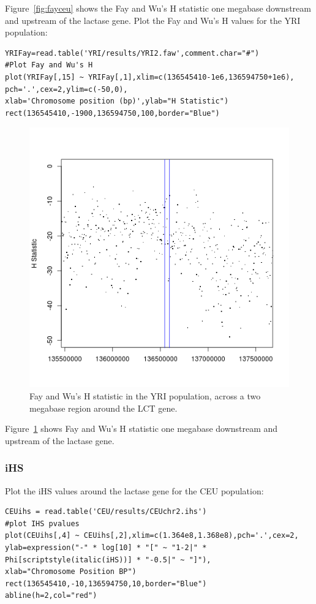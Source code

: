\documentclass[a4paper,10pt]{article}
\begin{document}
\noindent
Figure~\ref{fig:fayceu} shows the Fay and Wu's H statistic one
megabase downstream and upstream of the lactase gene.  Plot the Fay
and Wu's H values for the YRI population:\\
\begin{verbatim}
YRIFay=read.table('YRI/results/YRI2.faw',comment.char="#")
#Plot Fay and Wu's H
plot(YRIFay[,15] ~ YRIFay[,1],xlim=c(136545410-1e6,136594750+1e6),
pch='.',cex=2,ylim=c(-50,0),
xlab='Chromosome position (bp)',ylab="H Statistic")
rect(136545410,-1900,136594750,100,border="Blue") 
\end{verbatim}
\begin{figure}
\centering
\includegraphics{pictures/YRIFay.png}
\caption{Fay and Wu's H statistic in the YRI population, across a two
  megabase region around the LCT gene.} 
\label{fig:fayyri}
\end{figure}

\noindent
Figure~\ref{fig:fayyri} shows Fay and Wu's H statistic one megabase
downstream and upstream of the lactase gene.

\subsubsection{iHS}
Plot the iHS values around the lactase gene for the CEU population:\\
\begin{verbatim}
CEUihs = read.table('CEU/results/CEUchr2.ihs')
#plot IHS pvalues
plot(CEUihs[,4] ~ CEUihs[,2],xlim=c(1.364e8,1.368e8),pch='.',cex=2,
ylab=expression("-" * log[10] * "[" ~ "1-2|" * Phi[scriptstyle(italic(iHS))] * "-0.5|" ~ "]"),
xlab="Chromosome Position BP") 
rect(136545410,-10,136594750,10,border="Blue") 
abline(h=2,col="red")
\end{verbatim}
\end{document}
